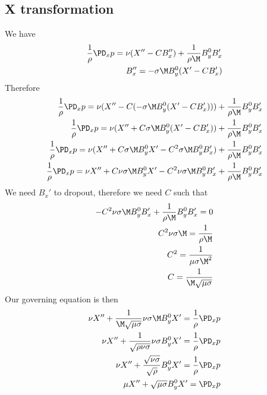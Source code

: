 \documentclass[11pt]{article}
\begin{document}
\subsection{X transformation}
We have
\begin{equation}\begin{aligned}
\frac{1}{\rho}\PD_x p = \nu (X''-C B_x'') + \frac{1}{\rho \M} B_y^0 B_x' \\
B_x'' = - \sigma \M B_y^0 (X' - C B_x') \\
\end{aligned} \end{equation}
Therefore
\begin{equation}\begin{aligned}
\frac{1}{\rho}\PD_x p = \nu (X''-C (- \sigma \M B_y^0 (X' - C B_x'))) + \frac{1}{\rho \M} B_y^0 B_x' \\
\frac{1}{\rho}\PD_x p = \nu (X''+C \sigma \M B_y^0 (X' - C B_x')) + \frac{1}{\rho \M} B_y^0 B_x' \\
\frac{1}{\rho}\PD_x p = \nu (X''+ C \sigma \M B_y^0 X' - C^2 \sigma \M B_y^0 B_x') + \frac{1}{\rho \M} B_y^0 B_x' \\
\frac{1}{\rho}\PD_x p = \nu X''+ C \nu \sigma \M B_y^0 X' - C^2 \nu \sigma \M B_y^0 B_x' + \frac{1}{\rho \M} B_y^0 B_x' \\
\end{aligned} \end{equation}
We need $B_x'$ to dropout, therefore we need $C$ such that
\begin{equation}\begin{aligned}
- C^2 \nu \sigma \M B_y^0 B_x' + \frac{1}{\rho \M} B_y^0 B_x' = 0 \\
C^2 \nu \sigma \M = \frac{1}{\rho \M} \\
C^2 = \frac{1}{ \mu \sigma \M^2} \\
C = \frac{1}{\M \sqrt{\mu \sigma}} \\
\end{aligned} \end{equation}
Our governing equation is then
\begin{equation}\begin{aligned}
\nu X''+ \frac{1}{\M \sqrt{\mu \sigma}} \nu \sigma \M B_y^0 X' = \frac{1}{\rho}\PD_x p \\
\nu X''+ \frac{1}{\sqrt{\rho \nu \sigma}} \nu \sigma B_y^0 X' = \frac{1}{\rho}\PD_x p \\
\nu X''+ \frac{\sqrt{\nu \sigma}}{\sqrt{\rho}} B_y^0 X' = \frac{1}{\rho}\PD_x p \\
\mu X''+ \sqrt{\mu \sigma} B_y^0 X' = \PD_x p\\
\end{aligned} \end{equation}
\end{document}
